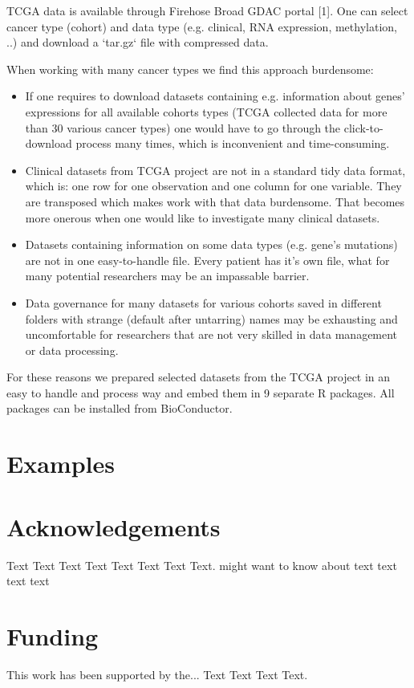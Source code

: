 \documentclass{bioinfo}
\begin{document}
TCGA data is available through Firehose Broad GDAC portal [1]. One can select cancer type (cohort) and data type (e.g. clinical, RNA expression, methylation, ..) and download a `tar.gz` file with compressed data. 

When working with many cancer types we find this approach burdensome:

\begin{itemize}
\item If one requires to download datasets containing e.g. information about genes' expressions for all available cohorts types (TCGA collected data for more than 30 various cancer types) one would have to go through the click-to-download process many times, which is inconvenient and time-consuming.
\item Clinical datasets from TCGA project are not in a standard tidy data format, which is: one row for one observation and one column for one variable. They are transposed which makes work with that data burdensome. That becomes more onerous when one would like to investigate
many clinical datasets.
\item Datasets containing information on some data types (e.g. gene's mutations) are not in one easy-to-handle file. Every patient has it's own file, what for many potential researchers may be an impassable barrier. 
\item Data governance for many datasets for various cohorts saved in different folders with strange (default after untarring) names may be exhausting and uncomfortable for researchers that are not very skilled in data management or data processing.
\end{itemize}
For these reasons we prepared selected datasets from the TCGA project in an easy to handle and process way and embed them in 9 separate R packages. All packages can be installed from BioConductor.

\section{Examples}

\section*{Acknowledgements}

Text Text Text Text Text Text  Text Text.  \citealp{Boffelli03} might want to know about  text
text text text\vspace*{-12pt}

\section*{Funding}

This work has been supported by the... Text Text  Text Text.\vspace*{-12pt}

%
%
%
%
%
%
%
%
%


\begin{thebibliography}{}

\end{thebibliography}
\end{document}
